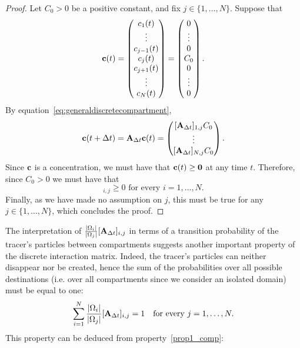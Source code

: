 \begin{proof}
	Let $C_0 > 0$ be a positive constant, and fix $j \in \{1,\dots,N\}$. Suppose that 
	\begin{equation}
		\mathbf c(t) = \begin{pmatrix} c_1(t) \\ \vdots \\ c_{j-1}(t) \\ c_j(t) \\ c_{j+1}(t) \\ \vdots \\ c_N(t) \end{pmatrix}
				= \begin{pmatrix} 0 \\ \vdots \\ 0 \\ C_0 \\ 0 \\ \vdots \\ 0 \end{pmatrix}.
	\end{equation}
	By equation~\eqref{eq:generaldiscretecompartment},
	\begin{equation}
		\b c(t+\Delta t) = \b A_{\Delta t} \b c(t) = \begin{pmatrix} [\b A_{\Delta t}]_{1,j} C_0 \\ \vdots \\ [\b A_{\Delta t}]_{N,j} C_0 \end{pmatrix}.
	\end{equation}
	Since $\mathbf c$ is a concentration, we must have that $\mathbf c(t) \ge \mathbf 0$ at any time $t$. Therefore, since $C_0 > 0$ we must have that
	\begin{equation}
		[\b A_{\Delta t}]_{i,j} \ge 0 \mbox{ for every } i = 1,\dots,N.
	\end{equation}
	Finally, as we have made no assumption on $j$, this must be true for any $j \in \{1,\dots,N\}$, which concludes the proof.
\end{proof}
The interpretation of $\frac{|\Omega_i|}{|\Omega_j|}[\mathbf A_{\Delta t}]_{i,j}$ in terms of a transition probability of the tracer's particles between compartments suggests another important property of the discrete interaction matrix. Indeed, the tracer's particles can neither disappear nor be created, hence the sum of the probabilities over all possible destinations (i.e. over all compartments since we consider an isolated domain) must be equal to one:
\begin{equation}
	\sum_{i=1}^N \frac{|\Omega_i|}{|\Omega_j|}[\mathbf A_{\Delta t}]_{i,j} = 1 \quad \mbox{for every } j=1,\dots,N.
\end{equation}
This property can be deduced from property~\ref{prop1_comp}:

